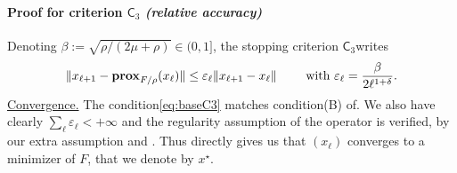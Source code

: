 \vspace*{2ex}
\paragraph{Proof for criterion $\mathsf{C}_3$ \emph{(relative accuracy)} }

Denoting $\beta := \sqrt{\rho/(2\mu+\rho)} \in (0,1]$, the stopping criterion $\mathsf{C}_3$writes
\begin{align}\label{eq:baseC3}
    \|x_{\ell+1} -  \mathbf{prox}_{F/\rho}(x_\ell)\| \leq   \varepsilon_\ell \|x_{\ell+1} -  x_\ell \|  \qquad\text{ with }    \varepsilon_\ell =  \frac{\beta}{2\ell^{1+\delta}} .
\end{align}
\noindent\underline{Convergence.} The condition\;\eqref{eq:baseC3} matches condition\;(B) of\;\cite[Th.~2]{rockafellar1976monotone}. We also have clearly $\sum_\ell \varepsilon_\ell < +\infty$ and the regularity assumption of the operator is verified, by our extra assumption and   \cite[Prop.~7]{rockafellar1976monotone}. Thus \cite[Th.~2]{rockafellar1976monotone} directly gives us that $(x_\ell)$ converges to a minimizer of $F$, that we denote by $x^\star$.

